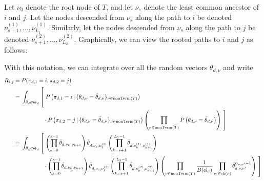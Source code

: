\documentclass{article}
\theoremstyle{definition}
\newcommand{\nonTerm}{\text{nonTerm}}
\newcommand{\tallbracketl}[2]{\left #1 \rule{0ex}{#2} \right.}
\newcommand{\tallbracketr}[2]{\left. \rule{0ex}{#2} \right #1}
\begin{document}
Let $\nu_0$ denote the root node of $T$, and let $\nu_s$ denote the least common ancestor of $i$ and $j$.
Let the nodes descended from $\nu_s$ along the path to $i$ be denoted $\nu^{(1)}_{s+1}, \ldots, \nu^{(1)}_{L_1}$.
Similarly, let the nodes descended from $\nu_s$ along the path to $j$ be denoted $\nu^{(2)}_{s+1}, \ldots, \nu^{(2)}_{L_2}$.
Graphically, we can view the rooted paths to $i$ and $j$ as follows:
\begin{center}
\end{center}

With this notation, we can integrate over all the random vectors $\theta_{d,\nu}$ and write
{
\newcommand{\prefix}{\int_{\tilde \theta_d \in \Theta_d} \tallbracketl{[}{5ex}}
\begin{align*}
R_{i,j}
={}&P(\pi_{d,1} = i, \pi_{d,2} = j)
\\
={}&
\prefix
  P\left(\pi_{d,1}=i \,|\, \{ \theta_{d,\nu} = \tilde \theta_{d,\nu} \}_{\nu \in \nonTerm(T)}\right)
\\ &\phantom{\prefix}
  \cdot P\left(\pi_{d,2}=j \,|\, \{ \theta_{d,\nu} = \tilde \theta_{d,\nu} \}_{\nu \in \nonTerm(T)}\right)
  \left(
    \prod_{\nu \in \nonTerm(T)} P\left(\theta_{d,\nu} = \tilde \theta_{d,\nu}\right)
  \right)
  \tallbracketr{]}{5ex}
\\
={}&
\prefix
  \left(
    \prod_{k=0}^{s-1} \tilde \theta_{d,\nu_k,\nu_{k+1}}
  \right)
  \tilde \theta_{d,\nu_s,\nu^{(1)}_1}
  \left(
    \prod_{k=s+1}^{L_1-1} \tilde \theta_{d,\nu^{(1)}_{k},\nu^{(1)}_{k+1}}
  \right)
\\ &\phantom{\prefix}
  \cdot
  \left(
    \prod_{k=0}^{s-1} \tilde \theta_{d,\nu_k,\nu_{k+1}}
  \right)
  \tilde \theta_{d,\nu_s,\nu^{(2)}_1}
  \left(
    \prod_{k=s+1}^{L_2-1} \tilde \theta_{d,\nu^{(2)}_{k},\nu^{(2)}_{k+1}}
  \right)
  \left(
    \prod_{\nu \in \nonTerm(T)}
    \frac{1}{B(\vec\alpha_\nu)}
    \prod_{\nu' \in \text{ch}(\nu)}
    \tilde \theta_{d,\nu,\nu'}^{\alpha_{\nu,\nu'}-1}
  \right)
  \tallbracketr{]}{5ex}
\end{align*}
}
\end{document}
